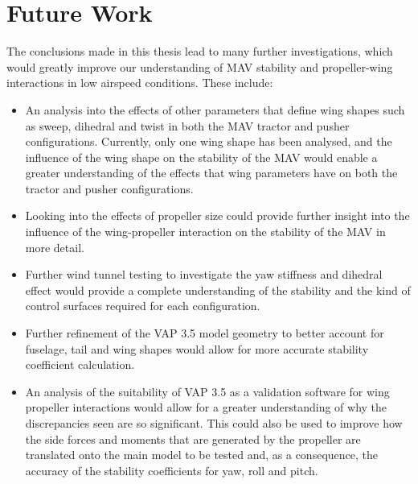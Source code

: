 \section{Future Work}
The conclusions made in this thesis lead to many further investigations, which would greatly improve our understanding of \acrshort{MAV} stability and propeller-wing interactions in low airspeed conditions. These include:

\begin{itemize}
    \item An analysis into the effects of other parameters that define wing shapes such as sweep, dihedral and twist in both the \acrshort{MAV} tractor and pusher configurations. Currently, only one wing shape has been analysed, and the influence of the wing shape on the stability of the \acrshort{MAV} would enable a greater understanding of the effects that wing parameters have on both the tractor and pusher configurations. 

    \item Looking into the effects of propeller size could provide further insight into the influence of the wing-propeller interaction on the stability of the \acrshort{MAV} in more detail. 


    \item Further wind tunnel testing to investigate the yaw stiffness and dihedral effect would provide a complete understanding of the stability and the kind of control surfaces required for each configuration.

    \item Further refinement of the VAP 3.5 model geometry to better account for fuselage, tail and wing shapes would allow for more accurate stability coefficient calculation.
    
    \item An analysis of the suitability of VAP 3.5 as a validation software for wing propeller interactions would allow for a greater understanding of why the discrepancies seen are so significant. This could also be used to improve how the side forces and moments that are generated by the propeller are translated onto the main model to be tested and, as a consequence, the accuracy of the stability coefficients for yaw, roll and pitch.

    
\end{itemize}